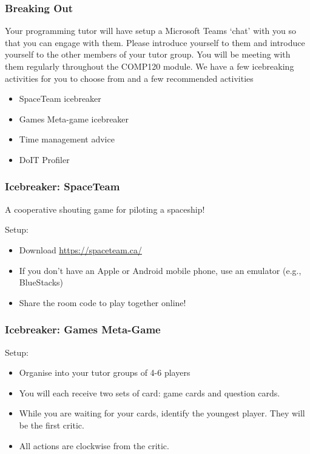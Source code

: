 \begin{frame}
	\frametitle{Breaking Out}
	
	Your programming tutor will have setup a Microsoft Teams `chat' with you so that you can engage with them. Please introduce yourself to them and introduce yourself to the other members of your tutor group. You will be meeting with them regularly throughout the COMP120 module. We have a few icebreaking activities for you to choose from and a few recommended activities
	
	\begin{itemize}
		\item SpaceTeam icebreaker
		\item Games Meta-game icebreaker
		\item Time management advice
		\item DoIT Profiler
	\end{itemize}
\end{frame}

\begin{frame}
	\frametitle{Icebreaker: SpaceTeam}
	
	A cooperative shouting game for piloting a spaceship!
	
	Setup:
	
	\begin{itemize}
		\item Download \url{https://spaceteam.ca/}
		\item If you don't have an Apple or Android mobile phone, use an emulator (e.g., BlueStacks)
		\item Share the room code to play together online!
	\end{itemize}
	
\end{frame}

\begin{frame}
	\frametitle{Icebreaker: Games Meta-Game}
	
	Setup:
	
	\begin{itemize}
		\item Organise into your tutor groups of 4-6 players
		\item You will each receive two sets of card: game cards and question cards.
		\item While you are waiting for your cards, identify the youngest player. They will be the first critic.
		\item All actions are clockwise from the critic.
	\end{itemize}
\end{frame}

